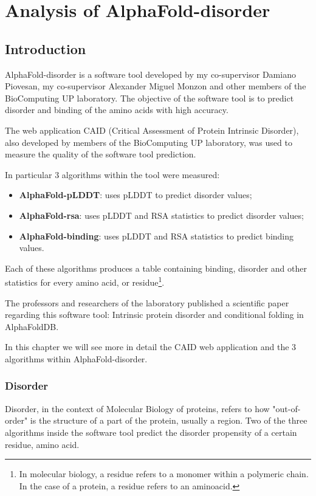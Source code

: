 \chapter{Analysis of AlphaFold-disorder}
\label{chp:alphafold-disorder}

\section{Introduction}
AlphaFold-disorder is a software tool developed by my co-supervisor Damiano Piovesan, my co-supervisor Alexander Miguel Monzon and other members of the BioComputing UP laboratory. The objective of the software tool is to predict disorder and binding of the amino acids with high accuracy. 

The web application CAID (Critical Assessment of Protein Intrinsic Disorder), also developed by members of the BioComputing UP laboratory, was used to measure the quality of the software tool prediction.

In particular 3 algorithms within the tool were measured: 
\begin{itemize}
    \item \textbf{AlphaFold-pLDDT}: uses pLDDT to predict disorder values;
    \item \textbf{AlphaFold-rsa}: uses pLDDT and RSA statistics to predict disorder values;
    \item \textbf{AlphaFold-binding}: uses pLDDT and RSA statistics to predict binding values.
\end{itemize}

Each of these algorithms produces a table containing binding, disorder and other statistics for every amino acid, or residue\footnote{In molecular biology, a residue refers to a monomer within a polymeric chain. In the case of a protein, a residue refers to an aminoacid.}. 

The professors and researchers of the laboratory published a scientific paper\cite{alphafold-disorder} regarding this software tool: Intrinsic protein disorder and conditional folding in AlphaFoldDB. 

In this chapter we will see more in detail the CAID web application and the 3 algorithms within AlphaFold-disorder.

\subsection{Disorder}
Disorder, in the context of Molecular Biology of proteins, refers to how "out-of-order" is the structure of a part of the protein, usually a region. Two of the three algorithms inside the software tool predict the disorder propensity of a certain residue, amino acid. 

